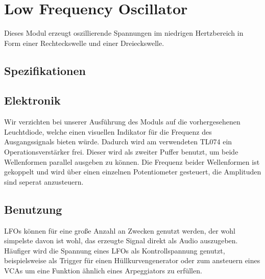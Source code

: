 \section{Low Frequency Oscillator}
\label{sec:org284f429}
Dieses Modul erzeugt oszillierende Spannungen im niedrigen Hertzbereich in Form einer Rechteckswelle und einer Dreieckswelle.
\subsection{Spezifikationen}
\label{sec:org5fb801b}
\subsection{Elektronik}
\label{sec:org9c2a833}
Wir verzichten bei unserer Ausführung des Moduls auf die vorhergesehenen Leuchtdiode, welche einen visuellen Indikator für die Frequenz des Ausgangssignals bieten würde. Dadurch wird am verwendeten TL074 ein Operationsverstärker frei. Dieser wird als zweiter Puffer benutzt, um beide Wellenformen parallel ausgeben zu können. Die Frequenz beider Wellenformen ist gekoppelt und wird über einen einzelnen Potentiometer gesteuert, die Amplituden sind seperat anzusteuern.

\subsection{Benutzung}
\label{sec:orgc792e9e}

LFOs können für eine große Anzahl an Zwecken genutzt werden, der wohl simpelste davon ist wohl, das erzeugte Signal direkt als Audio auszugeben. Häufiger wird die Spannung eines LFOs als Kontrollspannung genutzt, beispielsweise als Trigger für einen Hüllkurvengenerator oder zum ansteuern eines VCAs um eine Funktion ähnlich eines Arpeggiators zu erfüllen.
